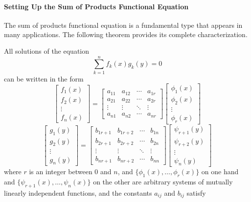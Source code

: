 \paragraph{Setting Up the Sum of Products Functional Equation}
The sum of products functional equation is a fundamental type that appears in many applications. The following theorem provides its complete characterization.
\begin{theorem}
All solutions of the equation
$$\sum_{k=1}^{n} f_k(x)g_k(y) = 0$$
can be written in the form
$$\begin{bmatrix} f_1(x) \\ f_2(x) \\ \vdots \\ f_n(x) \end{bmatrix} = \begin{bmatrix} a_{11} & a_{12} & \cdots & a_{1r} \\ a_{21} & a_{22} & \cdots & a_{2r} \\ \vdots & \vdots & \ddots & \vdots \\ a_{n1} & a_{n2} & \cdots & a_{nr} \end{bmatrix} \begin{bmatrix} \phi_1(x) \\ \phi_2(x) \\ \vdots \\ \phi_r(x) \end{bmatrix}$$
$$\begin{bmatrix} g_1(y) \\ g_2(y) \\ \vdots \\ g_n(y) \end{bmatrix} = \begin{bmatrix} b_{1r+1} & b_{1r+2} & \cdots & b_{1n} \\ b_{2r+1} & b_{2r+2} & \cdots & b_{2n} \\ \vdots & \vdots & \ddots & \vdots \\ b_{nr+1} & b_{nr+2} & \cdots & b_{nn} \end{bmatrix} \begin{bmatrix} \psi_{r+1}(y) \\ \psi_{r+2}(y) \\ \vdots \\ \psi_n(y) \end{bmatrix}$$
where $r$ is an integer between 0 and $n$, and $\{\phi_1(x), \ldots, \phi_r(x)\}$ on one hand and $\{\psi_{r+1}(x), \ldots, \psi_n(x)\}$ on the other are arbitrary systems of mutually linearly independent functions, and the constants $a_{ij}$ and $b_{ij}$ satisfy

\end{theorem}
